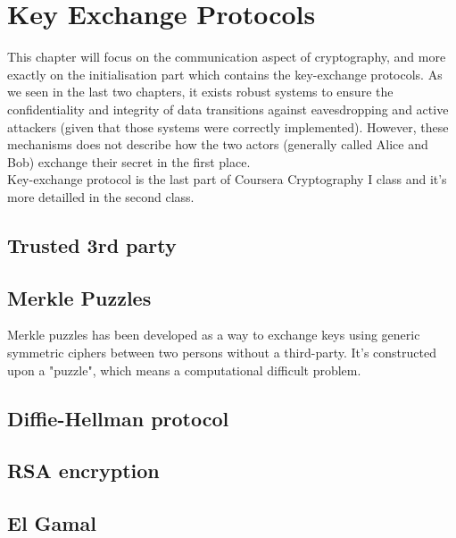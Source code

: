 \chapter{Key Exchange Protocols}

This chapter will focus on the communication aspect of cryptography, and more exactly on the initialisation part which contains the key-exchange protocols. As we seen in the last two chapters, it exists robust systems to ensure the confidentiality and integrity of data transitions against eavesdropping and active attackers (given that those systems were correctly implemented). However, these mechanisms does not describe how the two actors (generally called Alice and Bob) exchange their secret in the first place. \\
Key-exchange protocol is the last part of Coursera Cryptography I class and it's more detailled in the second class.

\section{Trusted 3rd party}



\section{Merkle Puzzles}
Merkle puzzles has been developed as a way to exchange keys using generic symmetric ciphers between two persons without a third-party. It's constructed upon a "puzzle", which means a computational difficult problem.






\section{Diffie-Hellman protocol}



\section{RSA encryption}



\section{El Gamal}